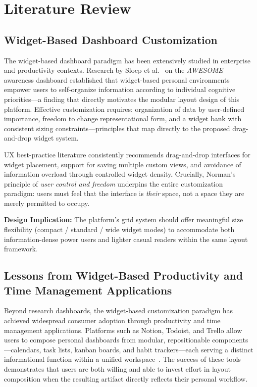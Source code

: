 \documentclass[14pt]{article}
\begin{document}
\section{Literature Review}

\subsection{Widget-Based Dashboard Customization}

The widget-based dashboard paradigm has been extensively studied in enterprise and productivity contexts. Research by Sloep et al.~\cite{sloep2011} on the \emph{AWESOME} awareness dashboard established that widget-based personal environments empower users to self-organize information according to individual cognitive priorities---a finding that directly motivates the modular layout design of this platform. Effective customization requires: organization of data by user-defined importance, freedom to change representational form, and a widget bank with consistent sizing constraints---principles that map directly to the proposed drag-and-drop widget system.

UX best-practice literature consistently recommends drag-and-drop interfaces for widget placement, support for saving multiple custom views, and avoidance of information overload through controlled widget density. Crucially, Norman's~\cite{norman2013} principle of \emph{user control and freedom} underpins the entire customization paradigm: users must feel that the interface is \emph{their} space, not a space they are merely permitted to occupy.

\smallskip
\noindent\textbf{Design Implication:} The platform's grid system should offer meaningful size flexibility (compact / standard / wide widget modes) to accommodate both information-dense power users and lighter casual readers within the same layout framework.

\subsection{Lessons from Widget-Based Productivity and Time Management Applications}

Beyond research dashboards, the widget-based customization paradigm has achieved widespread consumer adoption through productivity and time management applications. Platforms such as Notion, Todoist, and Trello allow users to compose personal dashboards from modular, repositionable components---calendars, task lists, kanban boards, and habit trackers---each serving a distinct informational function within a unified workspace~\cite{bodker2016}. The success of these tools demonstrates that users are both willing and able to invest effort in layout composition when the resulting artifact directly reflects their personal workflow.
\end{document}
